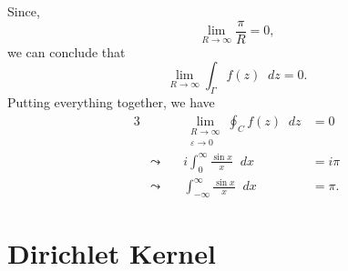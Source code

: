 \documentclass[a4paper]{article}
\newcommand*\diff{\mathop{}\!d} %
\theoremstyle{definition}
\begin{document}
Since,
\begin{equation*}
    \lim_{R \to \infty} \frac{\pi}{R} = 0,
\end{equation*}
we can conclude that
\begin{equation*}
    \lim_{R \to \infty} \int_{\Gamma} f(z) \diff z = 0.
\end{equation*}
Putting everything together, we have
\begin{alignat*}{3}
     &                & \lim_{\substack{R \to \infty                              \\ \varepsilon \to 0}} \oint_{C} f(z) \diff z & = 0 \\
     & \leadsto \quad & i\int_{0}^{\infty} \frac{\sin x}{x} \diff x      & = i\pi \\
     & \leadsto \quad & \int_{-\infty}^{\infty} \frac{\sin x}{x} \diff x & = \pi.
\end{alignat*}

\section{Dirichlet Kernel}
\end{document}
